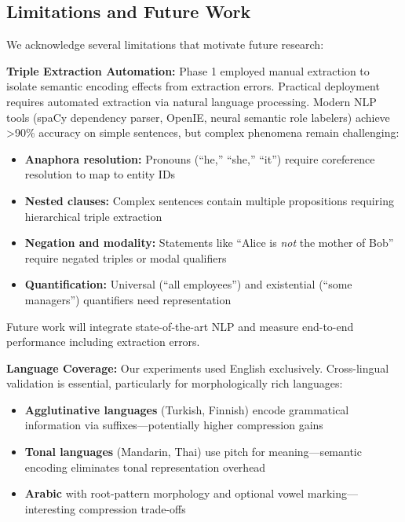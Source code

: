 \documentclass[conference]{IEEEtran}
\begin{document}
\subsection{Limitations and Future Work}

We acknowledge several limitations that motivate future research:

\textbf{Triple Extraction Automation:} Phase 1 employed manual extraction 
to isolate semantic encoding effects from extraction errors. Practical 
deployment requires automated extraction via natural language processing. 
Modern NLP tools (spaCy dependency parser, OpenIE, neural semantic role 
labelers) achieve >90\% accuracy on simple sentences, but complex phenomena 
remain challenging:

\begin{itemize}
\item \textbf{Anaphora resolution:} Pronouns (``he,'' ``she,'' ``it'') 
      require coreference resolution to map to entity IDs
\item \textbf{Nested clauses:} Complex sentences contain multiple propositions 
      requiring hierarchical triple extraction
\item \textbf{Negation and modality:} Statements like ``Alice is \textit{not} 
      the mother of Bob'' require negated triples or modal qualifiers
\item \textbf{Quantification:} Universal (``all employees'') and existential 
      (``some managers'') quantifiers need representation
\end{itemize}

Future work will integrate state-of-the-art NLP and measure end-to-end 
performance including extraction errors.

\textbf{Language Coverage:} Our experiments used English exclusively. 
Cross-lingual validation is essential, particularly for morphologically 
rich languages:

\begin{itemize}
\item \textbf{Agglutinative languages} (Turkish, Finnish) encode grammatical 
      information via suffixes—potentially higher compression gains
\item \textbf{Tonal languages} (Mandarin, Thai) use pitch for meaning—semantic 
      encoding eliminates tonal representation overhead
\item \textbf{Arabic} with root-pattern morphology and optional vowel 
      marking—interesting compression trade-offs
\end{itemize}
\end{document}
